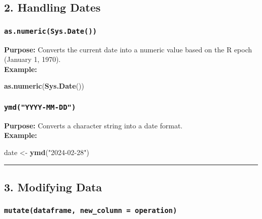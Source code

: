 \documentclass[
  11pt,
]{article}
\newenvironment{Shaded}{\begin{snugshade}}{\end{snugshade}}
\newcommand{\FunctionTok}[1]{\textcolor[rgb]{0.13,0.29,0.53}{\textbf{#1}}}
\newcommand{\NormalTok}[1]{#1}
\newcommand{\OtherTok}[1]{\textcolor[rgb]{0.56,0.35,0.01}{#1}}
\newcommand{\StringTok}[1]{\textcolor[rgb]{0.31,0.60,0.02}{#1}}
\begin{document}
\subsection{\texorpdfstring{\textbf{2. Handling
Dates}}{2. Handling Dates}}\label{handling-dates}

\subsubsection{\texorpdfstring{\textbf{\texttt{as.numeric(Sys.Date())}}}{as.numeric(Sys.Date())}}\label{as.numericsys.date}

\textbf{Purpose:} Converts the current date into a numeric value based
on the R epoch (January 1, 1970).\\
\textbf{Example:}

\begin{Shaded}
\begin{Highlighting}[]
\FunctionTok{as.numeric}\NormalTok{(}\FunctionTok{Sys.Date}\NormalTok{())}
\end{Highlighting}
\end{Shaded}

\subsubsection{\texorpdfstring{\textbf{\texttt{ymd("YYYY-MM-DD")}}}{ymd("YYYY-MM-DD")}}\label{ymdyyyy-mm-dd}

\textbf{Purpose:} Converts a character string into a date format.\\
\textbf{Example:}

\begin{Shaded}
\begin{Highlighting}[]
\NormalTok{date }\OtherTok{\textless{}{-}} \FunctionTok{ymd}\NormalTok{(}\StringTok{"2024{-}02{-}28"}\NormalTok{)}
\end{Highlighting}
\end{Shaded}

\begin{center}\rule{0.5\linewidth}{0.5pt}\end{center}

\subsection{\texorpdfstring{\textbf{3. Modifying
Data}}{3. Modifying Data}}\label{modifying-data}

\subsubsection{\texorpdfstring{\textbf{\texttt{mutate(dataframe,\ new\_column\ =\ operation)}}}{mutate(dataframe, new\_column = operation)}}\label{mutatedataframe-new_column-operation}
\end{document}
